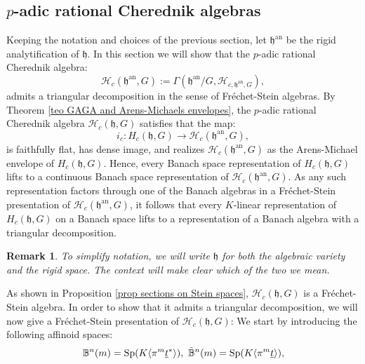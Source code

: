 \documentclass{amsart}
\newtheorem{obs}[defi]{{Remark}}
\newcommand{\Sp}{\operatorname{Sp}}
\begin{document}
\subsection{\texorpdfstring{$p$-adic rational Cherednik algebras}{}}\label{Section p-adic rational Cher algebra} Keeping the notation and choices of the previous section, let $\mathfrak{h}^{\operatorname{an}}$ be the rigid analytification of $\mathfrak{h}$. In this section we will show that the $p$-adic rational Cherednik algebra:
\begin{equation*}
\mathcal{H}_c(\mathfrak{h}^{\operatorname{an}},G):=\Gamma(\mathfrak{h}^{\operatorname{an}}/G,\mathcal{H}_{c,\mathfrak{h}^{\operatorname{an}},G}),
\end{equation*}
admits a triangular decomposition  in the sense of Fréchet-Stein algebras. By Theorem \ref{teo GAGA and Arens-Michaels envelopes}, the $p$-adic rational Cherednik algebra $\mathcal{H}_c(\mathfrak{h},G)$ satisfies that the map:
\begin{equation*}
  i_c:H_{c}(\mathfrak{h},G)\rightarrow\mathcal{H}_c(\mathfrak{h}^{\operatorname{an}},G),
\end{equation*}
is faithfully flat, has dense image, and realizes $\mathcal{H}_c(\mathfrak{h}^{\operatorname{an}},G)$ as the Arens-Michael envelope of $H_{c}(\mathfrak{h},G)$.  Hence, every  Banach space representation of $H_{c}(\mathfrak{h},G)$ lifts to a continuous Banach space representation of $\mathcal{H}_c(\mathfrak{h}^{\operatorname{an}},G)$. As any such representation factors through one of the Banach algebras in a Fréchet-Stein presentation of $\mathcal{H}_c(\mathfrak{h}^{\operatorname{an}},G)$, it follows that every $K$-linear representation of $H_{c}(\mathfrak{h},G)$ on a Banach space lifts to a representation of a Banach algebra with a triangular decomposition.
\begin{obs}
To simplify notation, we will write $\mathfrak{h}$ for both the algebraic variety and the rigid  space. The context will make clear which of the two we mean.
\end{obs}
As shown in Proposition \ref{prop sections on Stein spaces}, $\mathcal{H}_c(\mathfrak{h},G)$ is  a Fréchet-Stein algebra. In order to show that it admits a triangular decomposition, we will now give a  Fréchet-Stein presentation of $\mathcal{H}_c(\mathfrak{h},G)$:  We start by introducing the following affinoid spaces:
 \begin{equation*}
     \mathbb{B}^n(m)=\Sp(K\langle \pi^m\underline{t}^* \rangle ), \textnormal{ } \Tilde{\mathbb{B}}^n(m)=\Sp(K\langle \pi^m\underline{t} \rangle ),
 \end{equation*}
\end{document}
